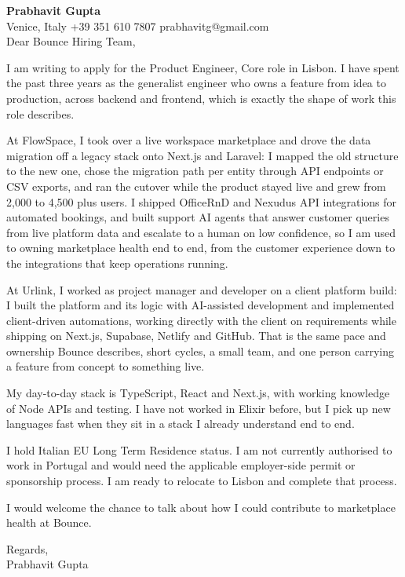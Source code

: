 \documentclass[a4paper,10.5pt]{article}
\begin{document}
\textbf{Prabhavit Gupta}\\
Venice, Italy \textbar{} +39 351 610 7807 \textbar{} prabhavitg@gmail.com\\[10pt]
Dear Bounce Hiring Team,

I am writing to apply for the Product Engineer, Core role in Lisbon. I have spent the past three years as the generalist engineer who owns a feature from idea to production, across backend and frontend, which is exactly the shape of work this role describes.

At FlowSpace, I took over a live workspace marketplace and drove the data migration off a legacy stack onto Next.js and Laravel: I mapped the old structure to the new one, chose the migration path per entity through API endpoints or CSV exports, and ran the cutover while the product stayed live and grew from 2,000 to 4,500 plus users. I shipped OfficeRnD and Nexudus API integrations for automated bookings, and built support AI agents that answer customer queries from live platform data and escalate to a human on low confidence, so I am used to owning marketplace health end to end, from the customer experience down to the integrations that keep operations running.

At Urlink, I worked as project manager and developer on a client platform build: I built the platform and its logic with AI-assisted development and implemented client-driven automations, working directly with the client on requirements while shipping on Next.js, Supabase, Netlify and GitHub. That is the same pace and ownership Bounce describes, short cycles, a small team, and one person carrying a feature from concept to something live.

My day-to-day stack is TypeScript, React and Next.js, with working knowledge of Node APIs and testing. I have not worked in Elixir before, but I pick up new languages fast when they sit in a stack I already understand end to end.

I hold Italian EU Long Term Residence status. I am not currently authorised to work in Portugal and would need the applicable employer-side permit or sponsorship process. I am ready to relocate to Lisbon and complete that process.

I would welcome the chance to talk about how I could contribute to marketplace health at Bounce.

Regards,\\
Prabhavit Gupta
\end{document}
